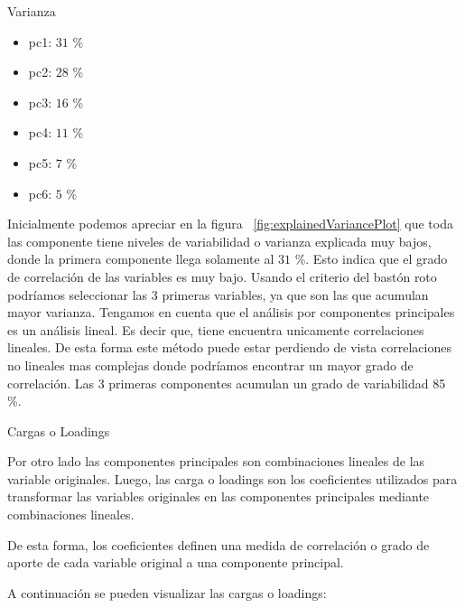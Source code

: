 \documentclass[11pt,a4paper,twoside]{thesis}
\begin{document}
\begin{description}
	\item[Varianza]
\end{description}
\begin{itemize}
	\item pc1: $31$ \%
	\item pc2: $28$ \%
	\item pc3: $16$ \%
	\item pc4: $11$ \%
	\item pc5: $7$  \%
	\item pc6: $5$  \%
\end{itemize}

Inicialmente podemos apreciar en la figura ~\ref{fig:explainedVariancePlot} que toda las componente tiene niveles de variabilidad o varianza explicada muy bajos, donde la primera componente llega solamente al $31$ \%. Esto indica que el grado de correlación de las variables es muy bajo. Usando el criterio del bastón roto podríamos seleccionar las 3 primeras variables, ya que son las que acumulan mayor varianza. Tengamos en cuenta que el análisis por componentes principales es un análisis lineal. Es decir que, tiene encuentra unicamente correlaciones lineales. De esta forma este método puede estar perdiendo de vista correlaciones no lineales mas complejas donde podríamos encontrar un mayor grado de correlación. Las 3 primeras componentes acumulan un grado de variabilidad 85 \%.


\begin{description}
	\item[Cargas o Loadings]
\end{description}

Por otro lado las componentes principales son combinaciones lineales de las variable originales. Luego, las carga o loadings son los coeficientes utilizados para transformar las variables originales en las componentes principales mediante combinaciones lineales.

De esta forma, los coeficientes definen una medida de correlación o grado de aporte de cada variable original a una componente principal.

A continuación se pueden visualizar las cargas o loadings:
\end{document}
